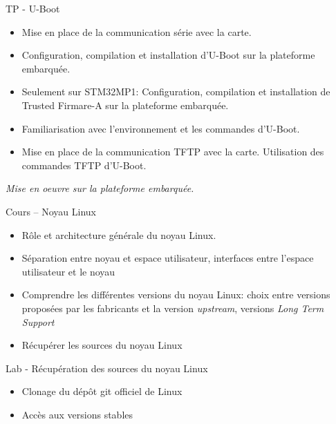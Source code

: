 \documentclass[a4paper,12pt,obeyspaces,spaces,hyphens]{article}
\begin{document}
\feagendaonecolumn
{TP - U-Boot}
{
  \begin{itemize}
  \item Mise en place de la communication série avec la carte.
  \item Configuration, compilation et installation d'U-Boot sur la
    plateforme embarquée.
  \item Seulement sur STM32MP1: Configuration, compilation et
    installation de Trusted Firmare-A sur la plateforme embarquée.
  \item Familiarisation avec l'environnement et les commandes
    d'U-Boot.
  \item Mise en place de la communication TFTP avec la carte.
    Utilisation des commandes TFTP d'U-Boot.
  \end{itemize}

  \vspace{0.5cm}
  {\em Mise en oeuvre sur la plateforme embarquée.}
}

\feagendatwocolumn
{Cours – Noyau Linux}
{
  \begin{itemize}
  \item Rôle et architecture générale du noyau Linux.
  \item Séparation entre noyau et espace utilisateur, interfaces entre
    l'espace utilisateur et le noyau
  \item Comprendre les différentes versions du noyau Linux: choix
    entre versions proposées par les fabricants et la version {\em
      upstream}, versions {\em Long Term Support}
  \item Récupérer les sources du noyau Linux
  \end{itemize}
}
{Lab - Récupération des sources du noyau Linux}
{
  \begin{itemize}
  \item Clonage du dépôt git officiel de Linux
  \item Accès aux versions stables
  \end{itemize}
}
\end{document}
